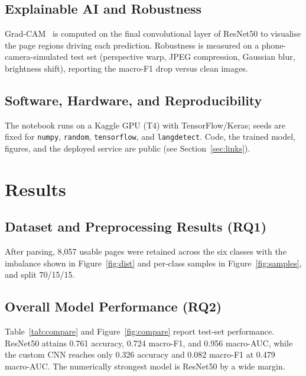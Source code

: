 \documentclass[preprint,12pt]{elsarticle}
\begin{document}
\subsection{Explainable AI and Robustness}
Grad-CAM~\cite{selvaraju2017grad} is computed on the final convolutional layer of
ResNet50 to visualise the page regions driving each prediction.
Robustness is measured on a phone-camera-simulated test set (perspective warp,
JPEG compression, Gaussian blur, brightness shift), reporting the macro-F1 drop
versus clean images.

\subsection{Software, Hardware, and Reproducibility}
The notebook runs on a Kaggle GPU (T4) with TensorFlow/Keras; seeds are fixed for
\texttt{numpy}, \texttt{random}, \texttt{tensorflow}, and \texttt{langdetect}.
Code, the trained model, figures, and the deployed service are public (see
Section~\ref{sec:links}).

\section{Results}\label{sec:results}

\subsection{Dataset and Preprocessing Results (RQ1)}
After parsing, 8{,}057 usable pages were retained across the six classes with the
imbalance shown in Figure~\ref{fig:dist} and per-class samples in
Figure~\ref{fig:samples}, and split 70/15/15.

\subsection{Overall Model Performance (RQ2)}
Table~\ref{tab:compare} and Figure~\ref{fig:compare} report test-set
performance.
ResNet50 attains 0.761 accuracy, 0.724 macro-F1, and 0.956 macro-AUC, while the
custom CNN reaches only 0.326 accuracy and 0.082 macro-F1 at 0.479 macro-AUC.
The numerically strongest model is ResNet50 by a wide margin.
\end{document}
